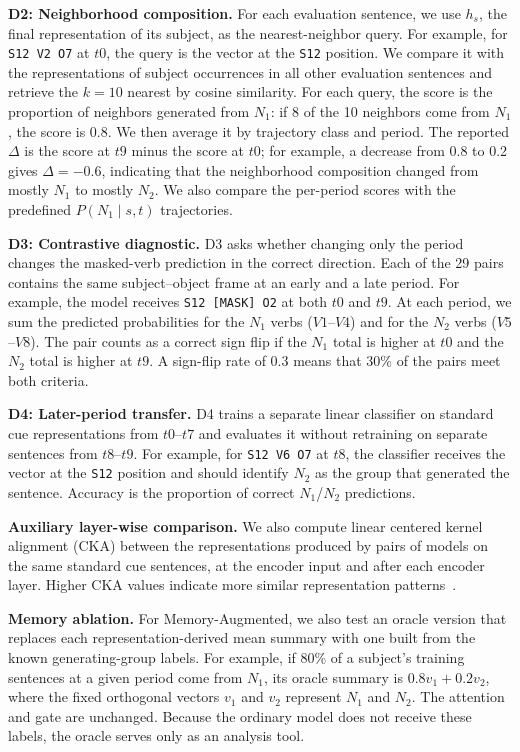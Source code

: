 \documentclass[runningheads]{llncs}
\begin{document}
\textbf{D2: Neighborhood composition.} For each evaluation sentence, we use
\(h_s\), the final representation of its subject, as the nearest-neighbor query. For example, for
\texttt{S12 V2 O7} at \(t0\), the query is the vector at the \texttt{S12}
position. We compare it with the representations of subject occurrences in all other
evaluation sentences and retrieve the \(k=10\) nearest by cosine similarity.
For each query, the score is the proportion of neighbors generated from $N_1$:
if 8 of the 10 neighbors come from $N_1$, the score is 0.8. We then average it
by trajectory class and period. The reported \(\Delta\) is the score at
\(t9\) minus the score at \(t0\); for example, a decrease from 0.8 to 0.2 gives
\(\Delta=-0.6\), indicating that the neighborhood composition changed from
mostly $N_1$ to mostly $N_2$. We also compare
the per-period scores with the predefined \(P(N_1 \mid s,t)\) trajectories.

\textbf{D3: Contrastive diagnostic.} D3 asks whether changing only the period changes
the masked-verb prediction in the correct direction. Each of the 29 pairs
contains the same subject--object frame at an early and a late period. For
example, the model receives \texttt{S12 [MASK] O2} at both \(t0\) and \(t9\).
At each period, we sum the predicted probabilities for the $N_1$ verbs
(\(V1\)--\(V4\)) and for the $N_2$ verbs (\(V5\)--\(V8\)). The pair counts as
a correct sign flip if the $N_1$ total is higher at \(t0\) and the $N_2$ total
is higher at \(t9\). A sign-flip rate of 0.3 means that 30\% of the pairs meet
both criteria.

\textbf{D4: Later-period transfer.} D4 trains a separate linear classifier on
standard cue representations from \(t0\)--\(t7\) and evaluates it without
retraining on separate sentences from \(t8\)--\(t9\). For example, for
\texttt{S12 V6 O7} at \(t8\), the classifier receives the vector at the
\texttt{S12} position and should identify $N_2$ as the group that generated the
sentence. Accuracy is the proportion of correct $N_1$/$N_2$ predictions.

\textbf{Auxiliary layer-wise comparison.} We also compute linear centered
kernel alignment (CKA) between the representations produced by pairs of models
on the same standard cue sentences, at the encoder input and after each encoder
layer. Higher CKA values indicate more similar representation
patterns~\cite{kornblith2019similarity}.

\textbf{Memory ablation.} For Memory-Augmented, we also test an oracle version
that replaces each representation-derived mean summary with one built from the
known generating-group labels. For example, if
80\% of a subject's training sentences at a given period come from $N_1$, its
oracle summary is \(0.8v_1+0.2v_2\), where the fixed orthogonal vectors
\(v_1\) and \(v_2\) represent $N_1$ and $N_2$. The attention and gate are
unchanged. Because the ordinary model does not receive these labels, the oracle
serves only as an analysis tool.
\end{document}
